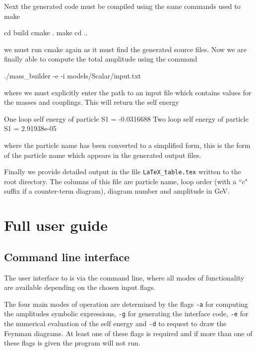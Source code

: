 Next the generated \CC code must be compiled using the same commands used to make \mb
\begin{lstterm}
cd build
cmake .
make
cd ..
\end{lstterm}
we must run cmake again as it must find the generated source files.
Now we are finally able to compute the total amplitude using the command
\begin{lstterm}
./mass_builder -e -i models/Scalar/input.txt
\end{lstterm}
where we must explicitly enter the path to an input file which contains values for the masses and couplings.  This will return the self energy
\begin{lstterm}
One loop self energy of particle S1 = -0.0316688
Two loop self energy of particle S1 = 2.91938e-05
\end{lstterm}
where the particle name has been converted to a simplified form, this is the form of the particle name which appears in the generated output files.

Finally we provide detailed output in the file \lstinline{LaTeX_table.tex} written to the root directory.  The columns of this file are particle name, loop order (with a ``c" suffix if a counter-term diagram), diagram number and amplitude in GeV.

\section{Full user guide}\label{sec:user_guide}
\subsection{Command line interface}

The user interface to \mb is via the command line, where all modes of functionality are available depending on the chosen input flags.

The four main modes of operation are determined by the flags \lstinline{-a} for computing the amplitudes symbolic expressions, \lstinline{-g} for generating the \tsil interface code, \lstinline{-e} for the numerical evaluation of the self energy and \lstinline{-d} to request \feynarts to draw the Feynman diagrams.  At least one of these flags is required and if more than one of these flags is given the program will not run.

